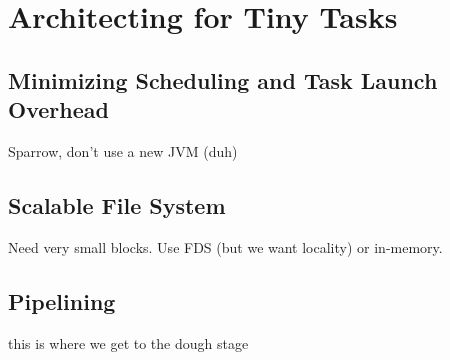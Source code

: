 \section{Architecting for Tiny Tasks}

\subsection{Minimizing Scheduling and Task Launch Overhead}
Sparrow, don't use a new JVM (duh)

\subsection{Scalable File System}
Need very small blocks. Use FDS (but we want locality) or in-memory.

\subsection{Pipelining}
this is where we get to the dough stage
